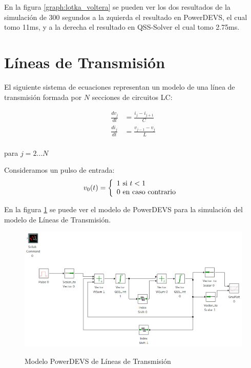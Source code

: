 En la figura \ref{graph:lotka_voltera} se pueden ver los dos resultados de la simulación de 300 segundos a la zquierda el resultado en PowerDEVS, el cual tomo 11ms,
y a la derecha el resultado en QSS-Solver el cual tomo 2.75ms.

\section{Líneas de Transmisión}
	El siguiente sistema de ecuaciones representan un modelo de una línea de transmisión formada por $N$ secciones de circuitos LC:

\begin{equation}
\begin{split}
\frac{d v_{j}}{d t} &= \frac{i_{j} - i_{j+1}}{C} \\
\frac{d i_{j}}{d t} &= \frac{v_{j-1} - v_{j}}{L} \\	
\end{split}
\end{equation}

para $j = 2 \dots N$

Consideramos un pulso de entrada:
\begin{equation}
v_0(t) = \left\{ 
  \begin{array}{l l}
    1 \text{ si } t < 1 \\
    0 \text{ en caso contrario }
  \end{array} \right.
\end{equation}

En la figura \ref{model:lclines} se puede ver el modelo de PowerDEVS para la simulación del modelo de Líneas de Transmisión.

\begin{figure}[H]
 \includegraphics[width=0.75\linewidth]{lclines}
\label{model:lclines}
\caption{Modelo PowerDEVS de Líneas de Transmisión}
\end{figure}

